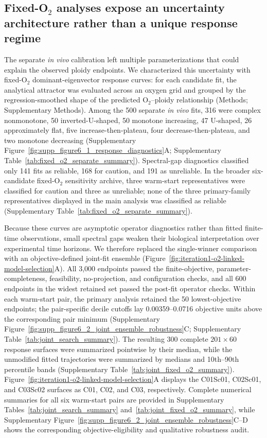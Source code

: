 \documentclass[11pt]{article}
\begin{document}
\subsection*{Fixed-O$_2$ analyses expose an uncertainty architecture rather than a unique response regime}

The separate \textit{in vivo} calibration left multiple parameterizations that could explain the observed ploidy endpoints. We characterized this uncertainty with fixed-O$_2$ dominant-eigenvector response curves: for each candidate fit, the analytical attractor was evaluated across an oxygen grid and grouped by the regression-smoothed shape of the predicted O$_2$--ploidy relationship (Methods; Supplementary Methods). Among the 500 separate \textit{in vivo} fits, 316 were complex nonmonotone, 50 inverted-U-shaped, 50 monotone increasing, 47 U-shaped, 26 approximately flat, five increase-then-plateau, four decrease-then-plateau, and two monotone decreasing (Supplementary Figure~\ref{fig:supp_figure6_1_response_diagnostics}A; Supplementary Table~\ref{tab:fixed_o2_separate_summary}). Spectral-gap diagnostics classified only 141 fits as reliable, 168 for caution, and 191 as unreliable. In the broader six-candidate fixed-O$_2$ sensitivity archive, three warm-start representatives were classified for caution and three as unreliable; none of the three primary-family representatives displayed in the main analysis was classified as reliable (Supplementary Table~\ref{tab:fixed_o2_separate_summary}).

Because these curves are asymptotic operator diagnostics rather than fitted finite-time observations, small spectral gaps weaken their biological interpretation over experimental time horizons. We therefore replaced the single-winner comparison with an objective-defined joint-fit ensemble (Figure~\ref{fig:iteration1-o2-linked-model-selection}A). All 3,000 endpoints passed the finite-objective, parameter-completeness, feasibility, no-projection, and configuration checks, and all 600 endpoints in the widest retained set passed the post-fit operator checks. Within each warm-start pair, the primary analysis retained the 50 lowest-objective endpoints; the pair-specific decile cutoffs lay 0.00359--0.0716 objective units above the corresponding pair minimum (Supplementary Figure~\ref{fig:supp_figure6_2_joint_ensemble_robustness}C; Supplementary Table~\ref{tab:joint_search_summary}). The resulting 300 complete \(201\times60\) response surfaces were summarized pointwise by their median, while the unmodified fitted trajectories were summarized by medians and 10th--90th percentile bands (Supplementary Table~\ref{tab:joint_fixed_o2_summary}). Figure~\ref{fig:iteration1-o2-linked-model-selection}A displays the C01Sc01, C02Sc01, and C03Sc02 surfaces as C01, C02, and C03, respectively. Complete numerical summaries for all six warm-start pairs are provided in Supplementary Tables~\ref{tab:joint_search_summary} and~\ref{tab:joint_fixed_o2_summary}, while Supplementary Figure~\ref{fig:supp_figure6_2_joint_ensemble_robustness}C--D shows the corresponding objective-eligibility and qualitative robustness audit.
\end{document}
